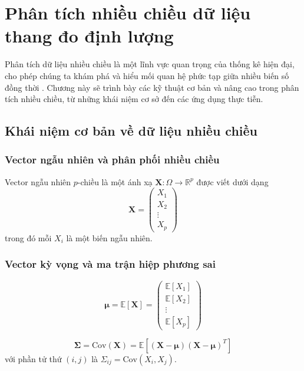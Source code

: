 \chapter{Phân tích nhiều chiều dữ liệu thang đo định lượng}

Phân tích dữ liệu nhiều chiều là một lĩnh vực quan trọng của thống kê hiện đại, cho phép chúng ta khám phá và hiểu mối quan hệ phức tạp giữa nhiều biến số đồng thời \cite{johnson2007, anderson1984, mardia1979}. Chương này sẽ trình bày các kỹ thuật cơ bản và nâng cao trong phân tích nhiều chiều, từ những khái niệm cơ sở đến các ứng dụng thực tiễn.

\section{Khái niệm cơ bản về dữ liệu nhiều chiều}

\subsection{Vector ngẫu nhiên và phân phối nhiều chiều}
\begin{dn}
Vector ngẫu nhiên $p$-chiều là một ánh xạ $\mathbf{X}: \Omega \to \mathbb{R}^p$ được viết dưới dạng
\[
\mathbf{X} = \begin{pmatrix} X_1 \\ X_2 \\ \vdots \\ X_p \end{pmatrix}
\]
trong đó mỗi $X_i$ là một biến ngẫu nhiên.
\end{dn}

\subsection{Vector kỳ vọng và ma trận hiệp phương sai}
\begin{dn}
\[
\boldsymbol{\mu} = \mathbb{E}[\mathbf{X}] = \begin{pmatrix} \mathbb{E}[X_1] \\ \mathbb{E}[X_2] \\ \vdots \\ \mathbb{E}[X_p] \end{pmatrix}
\]
\end{dn}

\begin{dn}
\[
\boldsymbol{\Sigma} = \text{Cov}(\mathbf{X}) = \mathbb{E}[(\mathbf{X} - \boldsymbol{\mu})(\mathbf{X} - \boldsymbol{\mu})^T]
\]
với phần tử thứ $(i,j)$ là $\Sigma_{ij} = \text{Cov}(X_i, X_j)$.
\end{dn}

